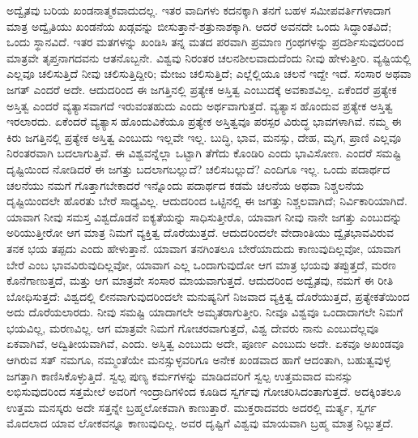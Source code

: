 ಅದ್ವೈತವು ಬರಿಯ ಖಂಡನಾತ್ಮಕವಾದುದಲ್ಲ. ಇತರ ವಾದಿಗಳು ಕದನಕ್ಕಾಗಿ ತನಗೆ ಬಹಳ ಸಮೀಪವರ್ತಿಗಳಾದಾಗ ಮಾತ್ರ ಅದ್ವೈತಿಯು ಖಂಡನೆಯ ಖಡ್ಗವನ್ನು ಬೀಸುತ್ತಾನೆ-ಶತ್ರುನಾಶಕ್ಕಾಗಿ. ಆದರೆ ಅವನದೇ ಒಂದು ಸಿದ್ಧಾಂತವಿದೆ; ಒಂದು ಸ್ಥಾನವಿದೆ. ಇತರ ಮತಗಳನ್ನು ಖಂಡಿಸಿ ತನ್ನ ಮತದ ಪರವಾಗಿ ಪ್ರಮಾಣ ಗ್ರಂಥಗಳನ್ನು ಪ್ರದರ್ಶಿಸುವುದರಿಂದ ಮಾತ್ರವೇ ತೃಪ್ತನಾಗ\-ದವನು ಆತನೊಬ್ಬನೇ. ವಿಶ್ವವು ನಿರಂತರ ಚಲನಶೀಲವಾದುದೆಂದು ನೀವು ಹೇಳುತ್ತೀರಿ. ವ್ಯಷ್ಟಿಯಲ್ಲಿ ಎಲ್ಲವೂ ಚಲಿಸುತ್ತಿದೆ ನೀವು ಚಲಿಸುತ್ತಿದ್ದೀರಿ; ಮೇಜು ಚಲಿಸುತ್ತಿದೆ; ಎಲ್ಲೆಲ್ಲಿಯೂ ಚಲನೆ ಇದ್ದೇ ಇದೆ. ಸಂಸಾರ ಅಥವಾ ಜಗತ್​ ಎಂದರೆ ಅದೇ. ಆದುದರಿಂದ ಈ ಜಗತ್ತಿನಲ್ಲಿ ಪ್ರತ್ಯೇಕ ಅಸ್ತಿತ್ವ  ಎಂಬುದಕ್ಕೆ ಅವಕಾಶವಿಲ್ಲ. ಏಕೆಂದರೆ ಪ್ರತ್ಯೇಕ ಅಸ್ತಿತ್ವ ಎಂದರೆ ವ್ಯತ್ಯಾಸವಾಗದೆ ಇರುವಂತಹುದು ಎಂದು ಅರ್ಥವಾಗುತ್ತದೆ. ವ್ಯತ್ಯಾಸ ಹೊಂದುವ ಪ್ರತ್ಯೇಕ ಅಸ್ತಿತ್ವ ಇರಲಾರದು. ಏಕೆಂದರೆ ವ್ಯತ್ಯಾಸ ಹೊಂದುವಿಕೆಯೂ ಪ್ರತ್ಯೇಕ ಅಸ್ತಿತ್ವವೂ ಪರಸ್ಪರ ವಿರುದ್ಧ ಭಾವಗಳಾಗಿವೆ. ನಮ್ಮ ಈ ಕಿರು ಜಗತ್ತಿನಲ್ಲಿ ಪ್ರತ್ಯೇಕ ಅಸ್ತಿತ್ವ ಎಂಬುದು ಇಲ್ಲವೇ ಇಲ್ಲ. ಬುದ್ಧಿ, ಭಾವ, ಮನಸ್ಸು, ದೇಹ, ಮೃಗ, ಪ್ರಾಣಿ ಎಲ್ಲವೂ ನಿರಂತರವಾಗಿ ಬದಲಾಗುತ್ತಿವೆ. ಈ ವಿಶ್ವವನ್ನೆಲ್ಲಾ ಒಟ್ಟಾಗಿ ತೆಗೆದು ಕೊಂಡಿರಿ ಎಂದು ಭಾವಿಸೋಣ. ಎಂದರೆ ಸಮಷ್ಟಿ ದೃಷ್ಟಿಯಿಂದ ನೋಡಿದರೆ ಈ ಜಗತ್ತು ಬದಲಾಗಬಲ್ಲುದೆ? ಚಲಿಸಬಲ್ಲುದೆ? ಎಂದಿಗೂ ಇಲ್ಲ. ಒಂದು ಪದಾರ್ಥದ ಚಲನೆಯು ನಮಗೆ ಗೊತ್ತಾಗಬೇಕಾದರೆ ಇನ್ನೊಂದು ಪದಾರ್ಥದ ಕಡಮೆ ಚಲನೆಯ ಅಥವಾ ನಿಶ್ಚಲನೆಯ ದೃಷ್ಟಿಯಿಂದಲೇ ಹೊರತು ಬೇರೆ ಸಾಧ್ಯವಿಲ್ಲ. ಆದುದರಿಂದ ಒಟ್ಟಿನಲ್ಲಿ ಈ ಜಗತ್ತು ನಿಶ್ಚಲವಾಗಿದೆ; ನಿರ್ವಿಕಾರಿಯಾಗಿದೆ. ಯಾವಾಗ ನೀವು ಸಮಸ್ತ ವಿಶ್ವದೊಡನೆ ಐಕ್ಯತೆಯನ್ನು ಸಾಧಿಸುತ್ತೀರೊ, ಯಾವಾಗ ನೀವು ನಾನೇ ಜಗತ್ತು ಎಂಬುದನ್ನು ಅರಿಯುತ್ತೀರೋ ಆಗ ಮಾತ್ರ ನಿಮಗೆ ವ್ಯಕ್ತಿತ್ವ ದೊರೆಯುತ್ತದೆ. ಆದುದರಿಂದಲೇ ವೇದಾಂತಿಯು ದ್ವೈತಭಾವವಿರುವ ತನಕ ಭಯ ತಪ್ಪದು ಎಂದು ಹೇಳುತ್ತಾನೆ. ಯಾವಾಗ ತನಗಿಂತಲೂ ಬೇರೆಯಾದುದು ಕಾಣುವುದಿಲ್ಲವೋ, ಯಾವಾಗ ಬೇರೆ ಎಂಬ ಭಾವವಿರುವುದಿಲ್ಲವೋ, ಯಾವಾಗ ಎಲ್ಲ ಒಂದಾಗುವುದೋ ಆಗ ಮಾತ್ರ ಭಯವು ತಪ್ಪುತ್ತದೆ, ಮರಣ ಕೊನೆಗಾಣುತ್ತದೆ, ಮತ್ತು ಆಗ ಮಾತ್ರವೇ ಸಂಸಾರ ಮಾಯವಾಗುತ್ತದೆ. ಆದುದರಿಂದ ಅದ್ವೈತವು, ನಮಗೆ ಈ ರೀತಿ ಬೋಧಿಸುತ್ತದೆ: ವಿಶ್ವದಲ್ಲಿ ಲೀನವಾಗುವುದರಿಂದಲೇ ಮನುಷ್ಯನಿಗೆ ನಿಜವಾದ ವ್ಯಕ್ತಿತ್ವ ದೊರೆಯುತ್ತದೆ, ಪ್ರತ್ಯೇಕತೆಯಿಂದ ಅದು ದೊರೆಯಲಾರದು. ನೀವು ಸಮಷ್ಟಿ ಯಾದಾಗಲೇ ಅಮೃತರಾಗುತ್ತೀರಿ. ನೀವೂ ವಿಶ್ವವೂ ಒಂದಾದಾಗಲೇ ನಿಮಗೆ ಭಯವಿಲ್ಲ, ಮರಣವಿಲ್ಲ. ಆಗ ಮಾತ್ರವೇ ನಿಮಗೆ ಗೋಚರವಾಗುತ್ತದೆ, ವಿಶ್ವ ದೇವರು ನಾನು ಎಂಬುದೆಲ್ಲವೂ ಏಕವಾಗಿವೆ, ಅದ್ವಿತೀಯವಾಗಿವೆ, ಎಂದು. ಅಸ್ತಿತ್ವ ಎಂಬುದು ಅದೇ, ಪೂರ್ಣ ಎಂಬುದು ಅದೇ. ಏಕವೂ ಅಖಂಡವೂ ಆಗಿರುವ ಸತ್​ ನಮಗೂ, ನಮ್ಮಂತೆಯೇ ಮನಸ್ಸುಳ್ಳವರಿಗೂ ಅನೇಕ ಖಂಡವಾದ ಹಾಗೆ ಆದಂತಾಗಿ, ಬಹುತ್ವವುಳ್ಳ ಜಗತ್ತಾಗಿ ಕಾಣಿಸಿಕೊಳ್ಳುತ್ತಿದೆ. ಸ್ವಲ್ಪ ಪುಣ್ಯ ಕರ್ಮಗಳನ್ನು ಮಾಡಿದವರಿಗೆ ಸ್ವಲ್ಪ ಉತ್ತಮವಾದ ಮನಸ್ಸು ಲಭಿಸುವುದರಿಂದ ಸತ್ತಮೇಲೆ ಅವರಿಗೆ ಇಂದ್ರಾದಿಗಳಿಂದ ಕೂಡಿದ ಸ್ವರ್ಗವು ಗೋಚರಿಸಿದಂತಾಗುತ್ತದೆ. ಅದಕ್ಕಿಂತಲೂ ಉತ್ತಮ ಮನಸ್ಕರು ಅದೇ ಸತ್ತನ್ನೇ ಬ್ರಹ್ಮಲೋಕವಾಗಿ ಕಾಣುತ್ತಾರೆ. ಮುಕ್ತರಾದವರು ಅದರಲ್ಲಿ ಮರ್ತ್ಯ, ಸ್ವರ್ಗ ಮೊದಲಾದ ಯಾವ ಲೋಕವನ್ನೂ ಕಾಣುವುದಿಲ್ಲ. ಅವರ ದೃಷ್ಟಿಗೆ ವಿಶ್ವವು ಮಾಯವಾಗಿ ಬ್ರಹ್ಮ ಮಾತ್ರ ನಿಲ್ಲುತ್ತದೆ.

\vskip 3pt

